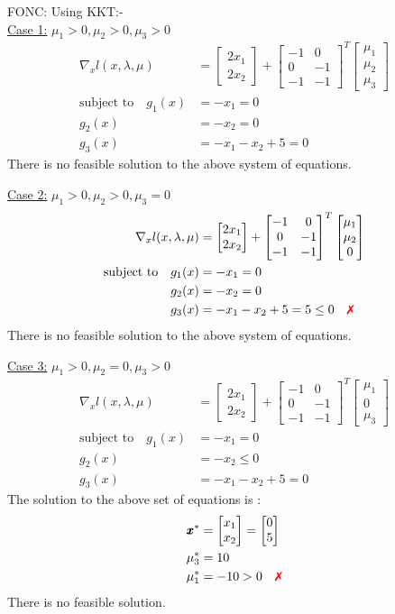 \documentclass[a4paper,11pt]{article}
\newcommand{\V}[1]{\pmb{#1}}
\newcommand{\mat}[1]{\begin{bmatrix}#1\end{bmatrix}}
\newcommand{\xmark}{{\color{red}\text{\ding{55}}}}%
\begin{document}
\noindent FONC: Using KKT:-\\

\noindent\underline{Case 1:} $\mu_1>0, \mu_2>0, \mu_3>0$
\begin{align*}
 \nabla_x l(x,\lambda,\mu) &= \mat{2x_1\\ 2x_2} +
\mat{-1& 0\\ 0& -1\\-1& -1}^T\mat{\mu_1\\ \mu_2\\ \mu_3}\\
% 
 \text{subject to}\quad g_1(x)&=-x_1 = 0\\
 g_2(x)&=-x_2 = 0\\
 g_3(x)&= -x_1 -x_2 +5=0
\end{align*}
There is no feasible solution to the above system of equations.

\noindent\underline{Case 2:} $\mu_1>0, \mu_2>0, \mu_3=0$
\begin{align*}
 \nabla_x l(x,\lambda,\mu) &= \mat{2x_1\\ 2x_2} +
\mat{-1& 0\\ 0& -1\\-1& -1}^T\mat{\mu_1\\ \mu_2\\ 0}\\
% 
 \text{subject to}\quad g_1(x)&=-x_1 = 0\\
 g_2(x)&=-x_2 = 0\\
 g_3(x)&= -x_1 -x_2 +5 = 5\leq0 \quad \xmark
\end{align*}
There is no feasible solution to the above system of equations.

\noindent\underline{Case 3:} $\mu_1>0, \mu_2=0, \mu_3>0$
\begin{align*}
 \nabla_x l(x,\lambda,\mu) &= \mat{2x_1\\ 2x_2} +
\mat{-1& 0\\ 0& -1\\-1& -1}^T\mat{\mu_1\\ 0\\ \mu_3}\\
% 
 \text{subject to}\quad g_1(x)&=-x_1 = 0\\
 g_2(x)&=-x_2 \leq 0\\
 g_3(x)&= -x_1 -x_2 +5 =0 
\end{align*}
The solution to the above set of equations is :
\begin{align*}
 \V{x}^*&=\mat{x_1\\x_2} = \mat{0\\5}\\
 \mu_3^*&=10\\
 \mu_1^*&=-10>0 \quad \xmark
\end{align*}
There is no feasible solution.
\end{document}
